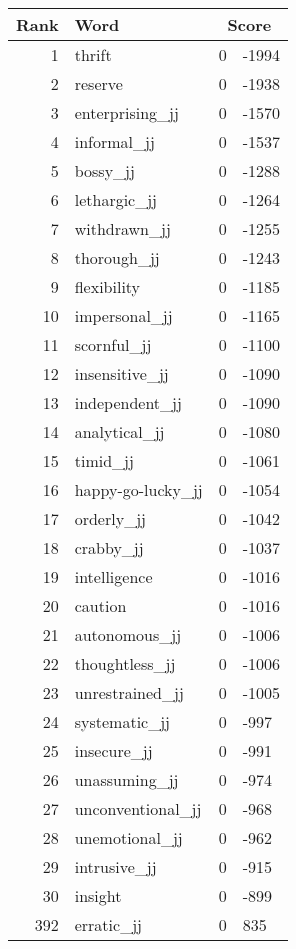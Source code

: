 \begin{longtable}[!htbp]{| rlr@{.}l |}
    \hline
    \textbf{Rank} & \textbf{Word} & \multicolumn{2}{c|}{\textbf{Score}} \\
    \hline
    \endhead
    1 & thrift & 0 & -1994 \\
    2 & reserve & 0 & -1938 \\
    3 & enterprising\_jj & 0 & -1570 \\
    4 & informal\_jj & 0 & -1537 \\
    5 & bossy\_jj & 0 & -1288 \\
    6 & lethargic\_jj & 0 & -1264 \\
    7 & withdrawn\_jj & 0 & -1255 \\
    8 & thorough\_jj & 0 & -1243 \\
    9 & flexibility & 0 & -1185 \\
    10 & impersonal\_jj & 0 & -1165 \\
    11 & scornful\_jj & 0 & -1100 \\
    12 & insensitive\_jj & 0 & -1090 \\
    13 & independent\_jj & 0 & -1090 \\
    14 & analytical\_jj & 0 & -1080 \\
    15 & timid\_jj & 0 & -1061 \\
    16 & happy-go-lucky\_jj & 0 & -1054 \\
    17 & orderly\_jj & 0 & -1042 \\
    18 & crabby\_jj & 0 & -1037 \\
    19 & intelligence & 0 & -1016 \\
    20 & caution & 0 & -1016 \\
    21 & autonomous\_jj & 0 & -1006 \\
    22 & thoughtless\_jj & 0 & -1006 \\
    23 & unrestrained\_jj & 0 & -1005 \\
    24 & systematic\_jj & 0 & -997 \\
    25 & insecure\_jj & 0 & -991 \\
    26 & unassuming\_jj & 0 & -974 \\
    27 & unconventional\_jj & 0 & -968 \\
    28 & unemotional\_jj & 0 & -962 \\
    29 & intrusive\_jj & 0 & -915 \\
    30 & insight & 0 & -899 \\
    392 & erratic\_jj & 0 & 835 \\

\end{longtable}
